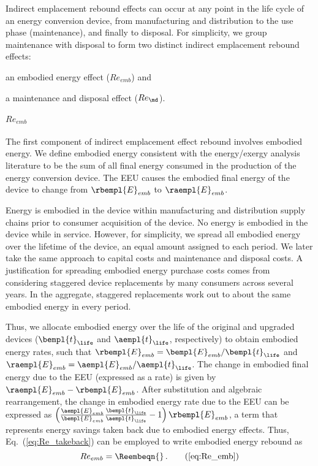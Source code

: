 Indirect emplacement rebound effects 
can occur at any point in the life cycle of an energy conversion device,
from manufacturing and distribution 
to the use phase (maintenance),
and finally to disposal.
For simplicity, we group maintenance with disposal to form
two distinct indirect emplacement rebound effects:
%
\begin{enumerate*}[label={(\alph*)}]
	
  \item an embodied energy effect ($Re_{emb}$) and 
  
  \item a maintenance and disposal effect ($Re_{\md}$).
    
\end{enumerate*}


\paragraph{$Re_{emb}$}
\label{sec:Re_emb}

The first component of indirect emplacement effect rebound
involves embodied energy.
We define embodied energy consistent with the energy/exergy analysis literature
to be the sum of all final energy consumed
in the production of the energy conversion device.
The EEU
causes the embodied final energy of the device to change
from $\rbempl{E}_{emb}$ to $\raempl{E}_{emb}$.

Energy is embodied in the device within manufacturing and distribution supply chains
prior to consumer acquisition of the device.
No energy is embodied in the device while in service.
However, for simplicity, we spread all embodied energy
over the lifetime of the device,
an equal amount assigned to each period.
We later take the same approach to capital costs and
maintenance and disposal costs.
A justification for spreading embodied energy purchase costs comes from considering
staggered device replacements by many consumers across several years.
In the aggregate, staggered replacements
work out to about the same embodied energy in every period.

Thus, we allocate embodied energy over the life of the original and upgraded devices
($\bempl{t}_{\life}$ and $\aempl{t}_{\life}$, respectively)
to obtain embodied energy rates, such that
$\rbempl{E}_{emb} = \bempl{E}_{emb} / \bempl{t}_{\life}$
and 
$\raempl{E}_{emb} = \aempl{E}_{emb} / \aempl{t}_{\life}$.
The change in embodied final energy due to the EEU (expressed as a rate) is given by
$\raempl{E}_{emb} - \rbempl{E}_{emb}$.
After substitution and algebraic rearrangement,
the change in embodied energy rate due to the EEU can be expressed as
$\left( \frac{\aempl{E}_{emb}}{\bempl{E}_{emb}}
  \frac{\bempl{t}_{\life}}{\aempl{t}_{\life}} - 1 \right) \rbempl{E}_{emb}$, 
a term that represents energy savings taken back due to embodied energy effects.
Thus, Eq.~(\ref{eq:Re_takeback}) can be employed to write embodied energy rebound as
%
\begin{equation} 
  Re_{emb} = \Reembeqn{} \, . \tag{\ref{eq:Re_emb}}
\end{equation}

